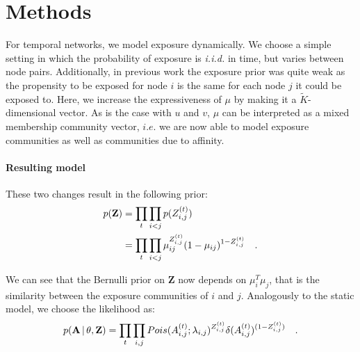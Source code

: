 \section{Methods}
For temporal networks, we model exposure dynamically. 
We choose a simple setting in which the probability of exposure is \textit{i.i.d.} in time, but varies 
between node pairs. 
Additionally, in previous work the exposure prior was quite weak as the propensity to be exposed for node $i$ is the same for each node $j$
it could be exposed to. Here, we increase the expressiveness of $\mu$ by making it a $\tilde{K}$-dimensional vector. 
As is the case with $u$ and $v$, $\mu$ can be interpreted as a mixed membership community vector, $\textit{i.e.}$
we are now able to model exposure communities as well as communities due to affinity.\\

\paragraph{Resulting model}
These two changes result in the following prior: 
\begin{equation}\label{eqn:expMarkov}
    \begin{aligned}
        p(\textbf{Z}) &= \prod_t \prod_{i<j} p(Z_{i,j}^{(t)}) \\
                      &= \prod_t \prod_{i<j} \mu_{ij}^{Z_{i,j}^{(t)}} (1-\mu_{ij})^{1-Z_{i,j}^{(t)}}\quad.
    \end{aligned}      
\end{equation}

We can see that the Bernulli prior on \textbf{Z} now depends on $\mu_i^T \mu_j$, that is the similarity between the exposure communities
of $i$ and $j$. 
Analogously to the static model, we choose the likelihood as:
\begin{equation}
    \begin{aligned}
        p(\textbf{A} \,|\, \theta, \textbf{Z}) = \prod_t \prod_{i,j} Pois(A_{i,j}^{(t)} ; \lambda_{i,j})^{Z_{i,j}^{(t)}} \delta(A_{i,j}^{(t)})^{(1-Z_{i,j}^{(t)})}\quad.
    \end{aligned}      
\end{equation}
